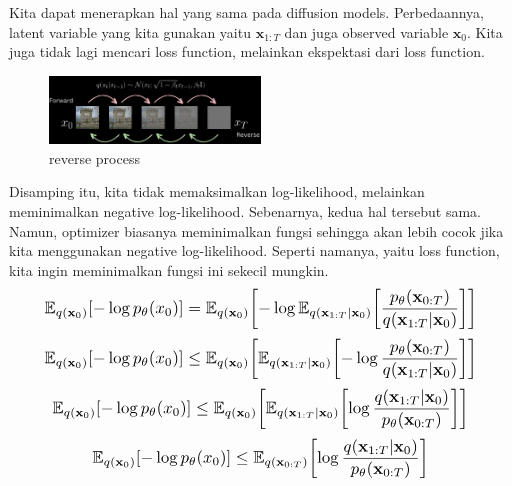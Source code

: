 \documentclass{article}
\newcommand*{\Scale}[2][4]{\scalebox{#1}{\ensuremath{#2}}}
\begin{document}
Kita dapat menerapkan hal yang sama pada diffusion models. Perbedaannya, latent variable yang kita gunakan yaitu $ \textbf{x}_{1:T} $ dan juga observed variable $ \textbf{x}_0 $. Kita juga tidak lagi mencari loss function, melainkan ekspektasi dari loss function.
\begin{figure}[h]
    \centering
    \includegraphics[width=0.5\textwidth]{fig/reverse-process.png}
    \caption{reverse process}
    \label{fig:reverse_process}
\end{figure}
Disamping itu, kita tidak memaksimalkan log-likelihood, melainkan meminimalkan negative log-likelihood. Sebenarnya, kedua hal tersebut sama. Namun, optimizer biasanya meminimalkan fungsi sehingga akan lebih cocok jika kita menggunakan negative log-likelihood. Seperti namanya, yaitu loss function, kita ingin meminimalkan fungsi ini sekecil mungkin.
\begin{equation}
\Scale[1.2]{ \displaystyle \mathbb{E}_{q(\mathbf{x}_0)} \left[ -\log p_\theta(x_0) \right] = 
\mathbb{E}_{q(\mathbf{x}_0)} \left[
-\log \mathbb{E}_{q(\textbf{x}_{1:T}|\textbf{x}_0)} \left[ \frac{p_\theta(\textbf{x}_{0:T})}{q(\textbf{x}_{1:T}|\textbf{x}_0)} \right] \right] }
\end{equation}
\begin{equation}
\Scale[1.2]{ \displaystyle \mathbb{E}_{q(\mathbf{x}_0)} \left[ -\log p_\theta(x_0) \right] \leq
\mathbb{E}_{q(\mathbf{x}_0)} \left[
\mathbb{E}_{q(\textbf{x}_{1:T}|\textbf{x}_0)} \left[ -\log \frac{p_\theta(\textbf{x}_{0:T})}{q(\textbf{x}_{1:T}|\textbf{x}_0)} \right] \right] }
\end{equation}
\begin{equation}
\Scale[1.2]{ \displaystyle \mathbb{E}_{q(\mathbf{x}_0)} \left[ -\log p_\theta(x_0) \right] \leq 
\mathbb{E}_{q(\mathbf{x}_0)} \left[
\mathbb{E}_{q(\textbf{x}_{1:T}|\textbf{x}_0)} \left[ \log \frac{q(\textbf{x}_{1:T}|\textbf{x}_0)}{p_\theta(\textbf{x}_{0:T})} \right] \right] }
\end{equation}
\begin{equation}
\Scale[1.2]{ \displaystyle \mathbb{E}_{q(\mathbf{x}_0)} \left[ -\log p_\theta(x_0) \right] \leq 
\mathbb{E}_{q(\textbf{x}_{0:T})} \left[ \log \frac{q(\textbf{x}_{1:T}|\textbf{x}_0)}{p_\theta(\textbf{x}_{0:T})} \right] }
\end{equation}
\end{document}

